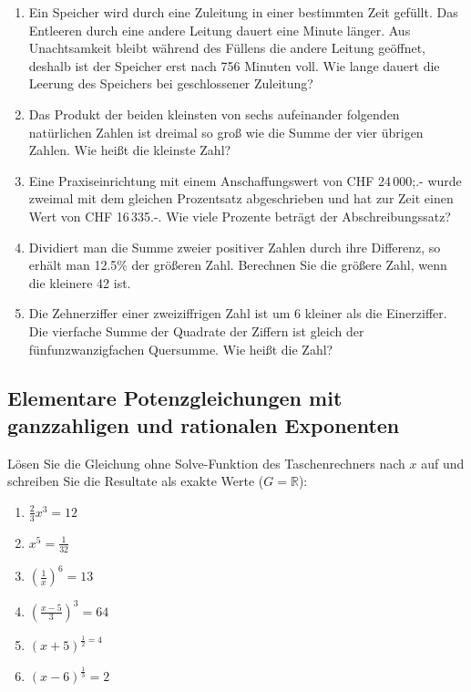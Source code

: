 \begin{enumerate}
  \item Ein Speicher wird durch eine Zuleitung in einer bestimmten
    Zeit gefüllt. Das Entleeren durch eine andere Leitung dauert eine
    Minute länger. Aus Unachtsamkeit bleibt während des Füllens die
    andere Leitung geöffnet, deshalb ist der Speicher erst nach 756
    Minuten voll. Wie lange dauert die Leerung des Speichers bei
    geschlossener Zuleitung?

    \item Das Produkt der beiden kleinsten von sechs aufeinander
      folgenden natürlichen Zahlen ist dreimal so groß wie die Summe
      der vier übrigen Zahlen. Wie heißt die kleinste Zahl?

      \item Eine Praxiseinrichtung mit einem Anschaffungswert von CHF
        24\,000;.- wurde zweimal mit dem gleichen Prozentsatz
        abgeschrieben und hat zur Zeit einen Wert von CHF 16\,335.-.
        Wie viele Prozente beträgt der Abschreibungssatz?

      \item Dividiert man die Summe zweier positiver Zahlen durch ihre
        Differenz, so erhält man 12.5\% der größeren Zahl.
        Berechnen Sie die größere Zahl, wenn die kleinere 42 ist.

        \item Die Zehnerziffer einer zweiziffrigen Zahl ist um 6
          kleiner als die Einerziffer. Die vierfache Summe der
          Quadrate der Ziffern ist gleich der fünfunzwanzigfachen
          Quersumme. Wie heißt die Zahl?
\end{enumerate}


\subsection{Elementare Potenzgleichungen mit ganzzahligen und
  rationalen Exponenten}
Lösen Sie die Gleichung ohne Solve-Funktion des Taschenrechners nach
$x$ auf und schreiben Sie die Resultate als exakte Werte ($G =
\mathbb{R}$):

\begin{multicols}{3}
\begin{enumerate}
\item $\frac{2}{3}x^3 = 12$
\item $x^5 = \frac{1}{32}$
\item $\left(\frac{1}{x}\right)^6 = 13$
\item $\left(\frac{x-5}{3}\right)^3=64$
\item $(x+5)^{\frac{1}{2} = 4}$
\item $\left(x-6\right)^{\frac{1}{3}} = 2$
\end{enumerate}
\end{multicols}



